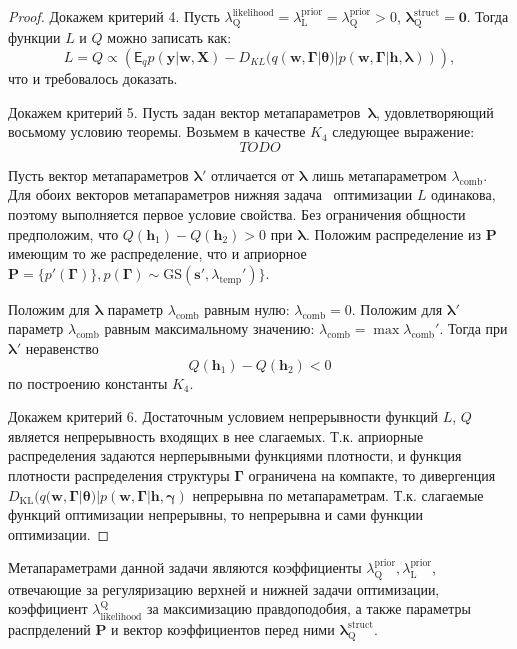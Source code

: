 \begin{proof}
Докажем критерий 4. Пусть $\lambda^\text{likelihood}_\text{Q} = \lambda^\text{prior}_\text{L} = \lambda^\text{prior}_\text{Q} > 0$, $\boldsymbol{\lambda}^\text{struct}_\text{Q} = \mathbf{0}$. Тогда функции $L$ и $Q$  можно записать как: $$L = Q \propto \left(\mathsf{E}_q p(\mathbf{y}|\mathbf{w}, \mathbf{X})-{D}_{KL}(q(\mathbf{w}, \boldsymbol{\Gamma}|\boldsymbol{\theta})|p(\mathbf{w}, \boldsymbol{\Gamma}|\mathbf{h}, \boldsymbol{\lambda}))\right),$$ что и требовалось доказать.

Докажем критерий 5. 
Пусть задан вектор метапараметров~$\boldsymbol{\lambda}$, удовлетворяющий восьмому условию теоремы. 
Возьмем в качестве $K_4$ следующее выражение:
\[
TODO
\]

Пусть вектор метапараметров $\boldsymbol{\lambda}'$ отличается от $\boldsymbol{\lambda}$ лишь метапараметром $\lambda_\text{comb}$. Для  обоих векторов метапараметров нижняя задача  оптимизации $L$ одинакова, поэтому выполняется первое условие свойства.
Без ограничения общности предположим, что $Q(\mathbf{h}_1)-Q(\mathbf{h}_2) > 0$ при $\boldsymbol{\lambda}.$
Положим распределение из $\mathbf{P}$ имеющим то же распределение, что и априорное $\mathbf{P} = \{p'(\boldsymbol{\Gamma})\}, p(\boldsymbol{\Gamma}) \sim \text{GS}(\mathbf{s}', \lambda_\text{temp}')\}$. 

Положим для $\boldsymbol{\lambda}$ параметр $\lambda_\text{comb}$ равным нулю: $\lambda_\text{comb} = 0$.
Положим для $\boldsymbol{\lambda}'$ параметр $\lambda_\text{comb}$ равным максимальному значению: $\lambda_\text{comb} = \max \lambda_\text{comb}'$.
Тогда при $\boldsymbol{\lambda}'$ неравенство 
\[
Q(\mathbf{h}_1)-Q(\mathbf{h}_2) < 0 
\]
по построению константы $K_4$.

Докажем критерий 6. Достаточным условием непрерывности функций $L$, $Q$ является непрерывность входящих в нее слагаемых. 
Т.к. априорные распределения задаются нерперывными функциями плотности, и функция плотности распределения структуры $\boldsymbol{\Gamma}$ ограничена на компакте, то дивергенция $D_\text{KL}(q(\mathbf{w}, \boldsymbol{\Gamma}|\boldsymbol{\theta})|p(\mathbf{w}, \boldsymbol{\Gamma}|\mathbf{h},\boldsymbol{\gamma})$ непрерывна по метапараметрам. Т.к. слагаемые функций оптимизации непрерывны, то непрерывна и сами функции оптимизации.
\end{proof}

Метапараметрами данной задачи являются коэффициенты $\lambda^\text{prior}_\text{Q}, \lambda^\text{prior}_\text{L}$, отвечающие за регуляризацию верхней и нижней задачи оптимизации, коэффициент $\lambda_\text{likelihood}^\text{Q}$ за максимизацию правдоподобия, а также параметры распрделений $\mathbf{P}$ и вектор коэффициентов перед ними $\boldsymbol{\lambda}^\text{struct}_\text{Q}$. 

